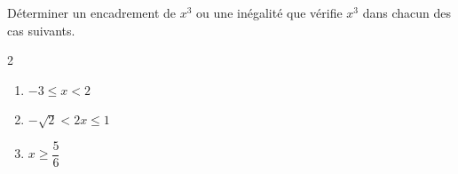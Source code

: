\begin{exo}{}
	Déterminer un encadrement de $x^3$ ou une inégalité que vérifie $x^3$ dans chacun des cas suivants.
	\vspace*{-2mm}
	\begin{multicols}{2}
		\begin{enumerate}[itemsep=2mm]
			\item $-3 \le x < 2$
			\item $-\sqrt{2} < 2x \le 1$
			\item $x \ge \dfrac{5}{6}$
		\end{enumerate}
	\end{multicols}\vspace*{-2mm}
\end{exo}
